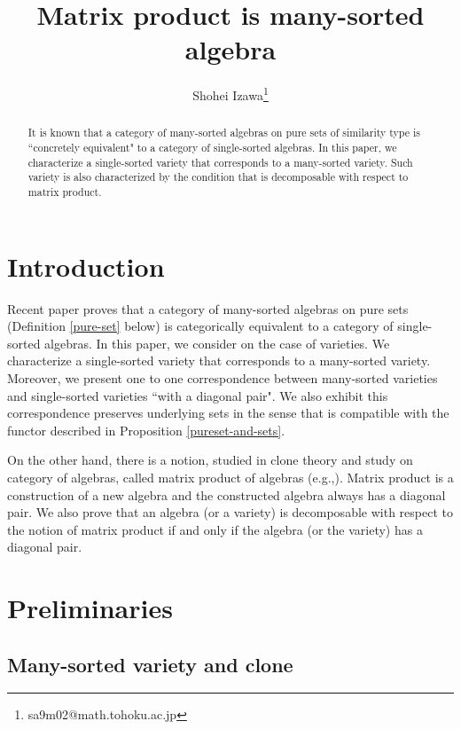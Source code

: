 \documentclass[a4paper,10pt]{article}
\title{Matrix product is many-sorted algebra}
\author{Shohei Izawa\footnote{sa9m02@math.tohoku.ac.jp}}
\date{}
\theoremstyle{definition}
\begin{document}
\maketitle
\begin{abstract}
It is known that a category of many-sorted algebras on pure sets of similarity type is ``concretely equivalent" to a category of single-sorted algebras.
In this paper, we characterize a single-sorted variety that corresponds to a many-sorted variety. Such variety is also characterized by the condition that is decomposable with respect to matrix product.
\end{abstract}

\section{Introduction} \label{s-introduction}

Recent paper \cite{MRS} proves that a category of many-sorted algebras on
pure sets (Definition \ref{pure-set} below) is categorically equivalent to
a category of single-sorted algebras.
In this paper, we consider on the case of varieties.
We characterize a single-sorted variety that corresponds to a many-sorted variety.
Moreover, we present one to one correspondence between many-sorted varieties
and single-sorted varieties ``with a diagonal pair".
We also exhibit this correspondence preserves underlying sets in the sense
that is compatible with the functor described in Proposition \ref{pureset-and-sets}.

On the other hand, there is a notion, studied in clone theory and study on category of algebras, called matrix product of algebras (e.g.\cite{Iza},\cite{Kea}).
Matrix product is a construction of a new algebra and the constructed algebra always has a diagonal pair.
We also prove that an algebra (or a variety) is decomposable with respect to the notion of matrix product if and only if the algebra (or the variety) has a diagonal pair.

\section{Preliminaries} \label{s-preliminaries}

\subsection{Many-sorted variety and clone} \label{s-many-sorted-variety-and-clone}
\end{document}
